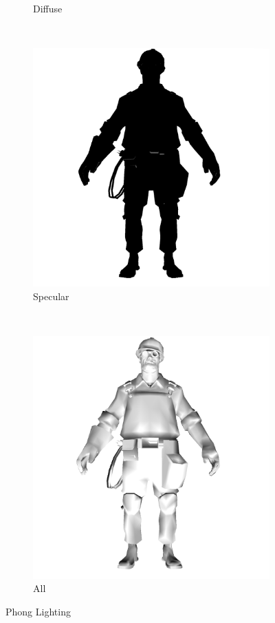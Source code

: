 \begin{figure}[h]
\begin{subfigure}[b]{0.2\textwidth}
        \caption{Diffuse}
        \label{fig:diffuse}
    \end{subfigure}
     ~
    \centering
    \begin{subfigure}[b]{0.2\textwidth}
        \includegraphics[width=\textwidth]{img/Lighting/specular.png}
        \caption{Specular}
        \label{fig:specular}
    \end{subfigure}
    ~
    \centering
    \begin{subfigure}[b]{0.2\textwidth}
        \includegraphics[width=\textwidth]{img/Lighting/combined.png}
        \caption{All}
        \label{fig:combined}
    \end{subfigure}
    \caption{Phong Lighting}
    \label{fig:Lighting}
\end{figure}

